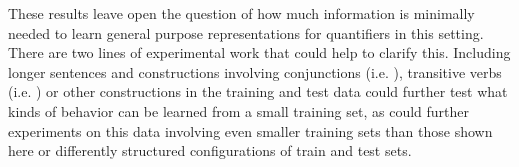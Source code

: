 
These results leave open the question of how much information is minimally needed to learn general purpose representations for quantifiers in this setting. There are two lines of experimental work that could help to clarify this. Including longer sentences and constructions involving conjunctions (i.e. ), transitive verbs (i.e. ) or other constructions in the training and test data could further test what kinds of behavior can be learned from a small training set, as could further experiments on this data involving even smaller training sets than those shown here or differently structured configurations of train and test sets.


